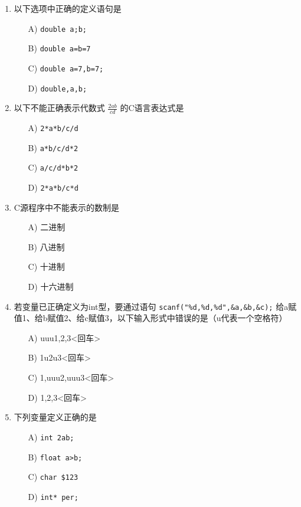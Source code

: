 \documentclass[a4paper,12pt]{article}
\begin{document}
\begin{enumerate}
	\item 以下选项中正确的定义语句是
	      \begin{enumerate}
		      \item[A)] \texttt{double a;b;}
		      \item[B)] \texttt{double a=b=7}
		      \item[C)] \texttt{double a=7,b=7;}
		      \item[D)] \texttt{double,a,b;}
	      \end{enumerate}
	      \vspace{0.3cm}

	\item 以下不能正确表示代数式 $\frac{2ab}{cd}$ 的C语言表达式是
	      \begin{enumerate}
		      \item[A)] \texttt{2*a*b/c/d}
		      \item[B)] \texttt{a*b/c/d*2}
		      \item[C)] \texttt{a/c/d*b*2}
		      \item[D)] \texttt{2*a*b/c*d}
	      \end{enumerate}
	      \vspace{0.3cm}

	\item C源程序中不能表示的数制是
	      \begin{enumerate}
		      \item[A)] 二进制
		      \item[B)] 八进制
		      \item[C)] 十进制
		      \item[D)] 十六进制
	      \end{enumerate}
	      \vspace{0.3cm}

	\item 若变量已正确定义为int型，要通过语句 \texttt{scanf("\%d,\%d,\%d",\&a,\&b,\&c);} 给a赋值1、给b赋值2、给c赋值3，以下输入形式中错误的是（u代表一个空格符）
	      \begin{enumerate}
		      \item[A)] uuu1,2,3<回车>
		      \item[B)] 1u2u3<回车>
		      \item[C)] 1,uuu2,uuu3<回车>
		      \item[D)] 1,2,3<回车>
	      \end{enumerate}
	      \vspace{0.3cm}

	\item 下列变量定义正确的是
	      \begin{enumerate}
		      \item[A)] \texttt{int 2ab;}
		      \item[B)] \texttt{float a>b;}
		      \item[C)] \texttt{char \$123}
		      \item[D)] \texttt{int* per;}
	      \end{enumerate}
	      \vspace{0.3cm}


\end{enumerate}
\end{document}
